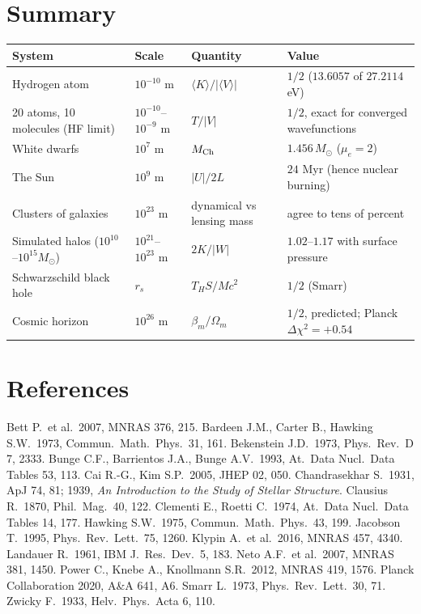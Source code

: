 \documentclass[11pt,a4paper]{article}
\begin{document}
\section{Summary}
\begin{table}[h]\centering\footnotesize
\begin{tabular}{p{4.0cm}p{2.0cm}p{2.6cm}p{5.2cm}}
\toprule
System & Scale & Quantity & Value\\\midrule
Hydrogen atom & $10^{-10}$ m & $\langle K\rangle/|\langle V\rangle|$ & $1/2$ ($13.6057$ of $27.2114$\,eV)\\
20 atoms, 10 molecules (HF limit) & $10^{-10}$--$10^{-9}$ m & $T/|V|$ & $1/2$, exact for converged wavefunctions\\
White dwarfs & $10^{7}$ m & $M_{\rm Ch}$ & $1.456\,M_\odot$ ($\mu_e=2$)\\
The Sun & $10^{9}$ m & $|U|/2L$ & $24$ Myr (hence nuclear burning)\\
Clusters of galaxies & $10^{23}$ m & dynamical vs lensing mass & agree to tens of percent\\
Simulated halos ($10^{10}$--$10^{15}M_\odot$) & $10^{21}$--$10^{23}$ m & $2K/|W|$ & $1.02$--$1.17$ with surface pressure\\
Schwarzschild black hole & $r_s$ & $T_HS/Mc^2$ & $1/2$ (Smarr)\\
Cosmic horizon & $10^{26}$ m & $\beta_m/\Omega_m$ & $1/2$, predicted; Planck $\Delta\chi^2=+0.54$\\\bottomrule
\end{tabular}
\end{table}

\section*{References}
\small
Bett P.\ et al.\ 2007, MNRAS 376, 215. \quad
Bardeen J.M., Carter B., Hawking S.W.\ 1973, Commun.\ Math.\ Phys.\ 31, 161. \quad
Bekenstein J.D.\ 1973, Phys.\ Rev.\ D 7, 2333. \quad
Bunge C.F., Barrientos J.A., Bunge A.V.\ 1993, At.\ Data Nucl.\ Data Tables 53, 113. \quad
Cai R.-G., Kim S.P.\ 2005, JHEP 02, 050. \quad
Chandrasekhar S.\ 1931, ApJ 74, 81; 1939, \emph{An Introduction to the Study of Stellar Structure}. \quad
Clausius R.\ 1870, Phil.\ Mag.\ 40, 122. \quad
Clementi E., Roetti C.\ 1974, At.\ Data Nucl.\ Data Tables 14, 177. \quad
Hawking S.W.\ 1975, Commun.\ Math.\ Phys.\ 43, 199. \quad
Jacobson T.\ 1995, Phys.\ Rev.\ Lett.\ 75, 1260. \quad
Klypin A.\ et al.\ 2016, MNRAS 457, 4340. \quad
Landauer R.\ 1961, IBM J.\ Res.\ Dev.\ 5, 183. \quad
Neto A.F.\ et al.\ 2007, MNRAS 381, 1450. \quad
Power C., Knebe A., Knollmann S.R.\ 2012, MNRAS 419, 1576. \quad
Planck Collaboration 2020, A\&A 641, A6. \quad
Smarr L.\ 1973, Phys.\ Rev.\ Lett.\ 30, 71. \quad
Zwicky F.\ 1933, Helv.\ Phys.\ Acta 6, 110.
\end{document}
